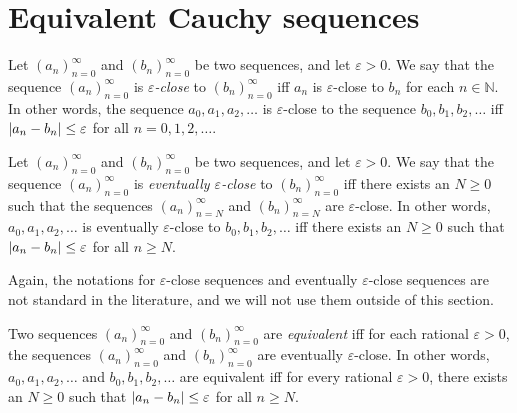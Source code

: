 \section{Equivalent Cauchy sequences}

\begin{definition}\label{5.2.1}
Let \((a_n)_{n = 0}^{\infty}\) and \((b_n)_{n = 0}^{\infty}\) be two sequences, and let \(\varepsilon > 0\).
We say that the sequence \((a_n)_{n = 0}^{\infty}\) is \emph{\(\varepsilon\)-close} to \((b_n)_{n = 0}^{\infty}\) iff \(a_n\) is \(\varepsilon\)-close to \(b_n\) for each \(n \in \mathds{N}\).
In other words, the sequence \(a_0, a_1, a_2, \dots\) is \(\varepsilon\)-close to the sequence \(b_0, b_1, b_2, \dots\) iff \(\abs*{a_n - b_n} \leq \varepsilon\) for all \(n = 0, 1, 2, \dots\).
\end{definition}

\setcounter{theorem}{2}
\begin{definition}\label{5.2.3}
Let \((a_n)_{n = 0}^{\infty}\) and \((b_n)_{n = 0}^{\infty}\) be two sequences, and let \(\varepsilon > 0\).
We say that the sequence \((a_n)_{n = 0}^{\infty}\) is \emph{eventually \(\varepsilon\)-close} to \((b_n)_{n = 0}^{\infty}\) iff there exists an \(N \geq 0\) such that the sequences \((a_n)_{n = N}^{\infty}\) and \((b_n)_{n = N}^{\infty}\) are \(\varepsilon\)-close.
In other words, \(a_0, a_1, a_2, \dots\) is eventually \(\varepsilon\)-close to \(b_0, b_1, b_2, \dots\) iff there exists an \(N \geq 0\) such that \(\abs*{a_n - b_n} \leq \varepsilon\) for all \(n \geq N\).
\end{definition}

\begin{remark}\label{5.2.4}
Again, the notations for \(\varepsilon\)-close sequences and eventually \(\varepsilon\)-close sequences are not standard in the literature, and we will not use them outside of this section.
\end{remark}

\setcounter{theorem}{5}
\begin{definition}\label{5.2.6}
Two sequences \((a_n)_{n = 0}^{\infty}\) and \((b_n)_{n = 0}^{\infty}\) are \emph{equivalent} iff for each rational \(\varepsilon > 0\), the sequences \((a_n)_{n = 0}^{\infty}\) and \((b_n)_{n = 0}^{\infty}\) are eventually \(\varepsilon\)-close.
In other words, \(a_0, a_1, a_2, \dots\) and \(b_0, b_1, b_2, \dots\) are equivalent iff for every rational \(\varepsilon > 0\), there exists an \(N \geq 0\) such that \(\abs*{a_n - b_n} \leq \varepsilon\) for all \(n \geq N\).
\end{definition}

